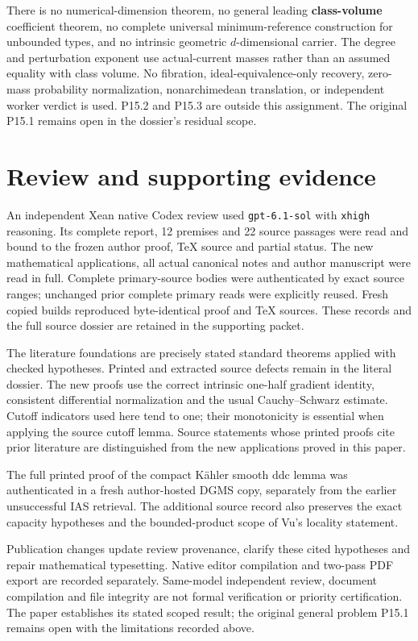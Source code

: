 \documentclass[
  11pt,
]{article}
\begin{document}
There is no numerical-dimension theorem, no general leading
\textbf{class-volume} coefficient theorem, no complete universal
minimum-reference construction for unbounded types, and no intrinsic
geometric \(d\)-dimensional carrier. The degree and perturbation
exponent use actual-current masses rather than an assumed equality with
class volume. No fibration, ideal-equivalence-only recovery, zero-mass
probability normalization, nonarchimedean translation, or independent
worker verdict is used. P15.2 and P15.3 are outside this assignment. The
original P15.1 remains open in the dossier's residual scope.

\section*{Review and supporting evidence}

An independent Xean native Codex review used \texttt{gpt-6.1-sol} with
\texttt{xhigh} reasoning. Its complete report, 12 premises and
22 source passages were read and bound to the frozen author
proof, TeX source and partial status. The new mathematical applications,
all actual canonical notes and author manuscript were read in full.
Complete primary-source bodies were authenticated by exact source ranges;
unchanged prior complete primary reads were explicitly reused. Fresh copied
builds reproduced byte-identical proof and TeX sources. These records and
the full source dossier are retained in the supporting packet.

The literature foundations are precisely stated standard theorems applied
with checked hypotheses. Printed and extracted source defects remain in
the literal dossier. The new proofs use the correct intrinsic one-half
gradient identity, consistent differential normalization and the usual
Cauchy--Schwarz estimate. Cutoff indicators used here tend to one; their
monotonicity is essential when applying the source cutoff lemma. Source
statements whose printed proofs cite prior literature are distinguished
from the new applications proved in this paper.

The full printed proof of the compact K\"ahler smooth ddc lemma was
authenticated in a fresh author-hosted DGMS copy, separately from the
earlier unsuccessful IAS retrieval. The additional source record also
preserves the exact capacity hypotheses and the bounded-product scope
of Vu's locality statement.

Publication changes update review provenance, clarify these cited
hypotheses and repair mathematical typesetting. Native editor compilation and two-pass PDF export are
recorded separately. Same-model independent review, document compilation
and file integrity are not formal verification or priority certification.
The paper establishes its stated scoped result; the original general
problem P15.1 remains open with the limitations recorded above.
\end{document}
